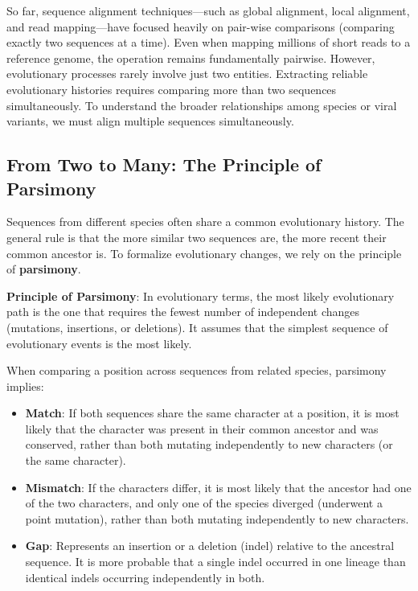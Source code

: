 So far, sequence alignment techniques—such as global alignment, local alignment, and read mapping—have focused heavily on pair-wise comparisons (comparing exactly two sequences at a time). Even when mapping millions of short reads to a reference genome, the operation remains fundamentally pairwise. However, evolutionary processes rarely involve just two entities. Extracting reliable evolutionary histories requires comparing more than two sequences simultaneously. To understand the broader relationships among species or viral variants, we must align multiple sequences simultaneously.

\subsection{From Two to Many: The Principle of Parsimony}

Sequences from different species often share a common evolutionary history. The general rule is that the more similar two sequences are, the more recent their common ancestor is. To formalize evolutionary changes, we rely on the principle of \textbf{parsimony}.

\begin{important}
    \textbf{Principle of Parsimony}: In evolutionary terms, the most likely evolutionary path is the one that requires the fewest number of independent changes (mutations, insertions, or deletions). It assumes that the simplest sequence of evolutionary events is the most likely.
\end{important}

When comparing a position across sequences from related species, parsimony implies:
\begin{itemize}
    \item \textbf{Match}: If both sequences share the same character at a position, it is most likely that the character was present in their common ancestor and was conserved, rather than both mutating independently to new characters (or the same character).
    \item \textbf{Mismatch}: If the characters differ, it is most likely that the ancestor had one of the two characters, and only one of the species diverged (underwent a point mutation), rather than both mutating independently to new characters.
    \item \textbf{Gap}: Represents an insertion or a deletion (indel) relative to the ancestral sequence. It is more probable that a single indel occurred in one lineage than identical indels occurring independently in both.
\end{itemize}

